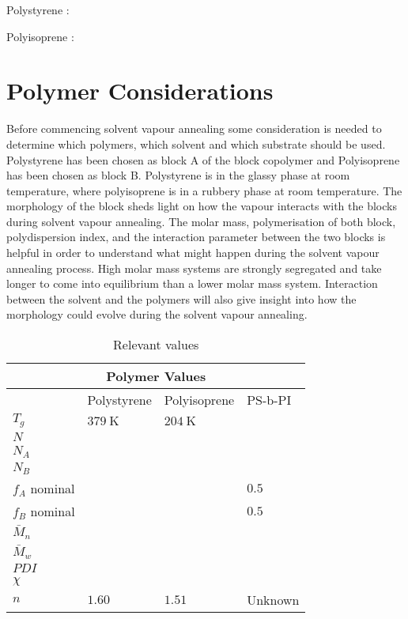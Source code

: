 \documentclass[MasterThesisMain.tex]{subfiles}
\begin{document}
\setpolymerdelim[]
Polystyrene :
\bigskip


\setpolymerdelim[]
Polyisoprene :


\section{Polymer Considerations}
Before commencing solvent vapour annealing some consideration is needed to determine which polymers, which solvent and which substrate should be used. Polystyrene has been chosen as block A of the block copolymer and Polyisoprene has been chosen as block B. Polystyrene is in the glassy phase at room temperature, where polyisoprene is in a rubbery phase at room temperature. The morphology of the block sheds light on how the vapour interacts with the blocks during solvent vapour annealing. The molar mass, polymerisation of both block, polydispersion index, and the interaction parameter between the two blocks is helpful in order to understand what might happen during the solvent vapour annealing process. High molar mass systems are strongly segregated and take longer to come into equilibrium than a lower molar mass system. Interaction between the solvent and the polymers will also give insight into how the morphology could evolve during the solvent vapour annealing.

\begin{table}
	\caption{Relevant values}
\begin{tabular}{ |p{3cm}||p{3cm}|p{3cm}|p{3cm}|  }
 \hline
 \multicolumn{4}{|c|}{Polymer Values} \\
 \hline
    & Polystyrene & Polyisoprene & PS-b-PI\\
 \hline
 $T_g$& $\SI{379}{\kelvin}$   & $\SI{204}{\kelvin}$  &   \\
 $N$&  &  &  \\
 $N_A$&  &  &  \\
 $N_B$&  &  &  \\
 $f_A$ nominal&  &  & $0.5$  \\
 $f_B$ nominal&  &  & $0.5$  \\
 $\bar{M}_n$&  &  &  \\
 $\bar{M}_w$&  &  &  \\
 $PDI$&  &  &  \\
 $\chi$&  &  &  \\
 $n$& $1.60$ & $1.51$ & Unknown\\
 \hline
\end{tabular}
\end{table}
\end{document}
